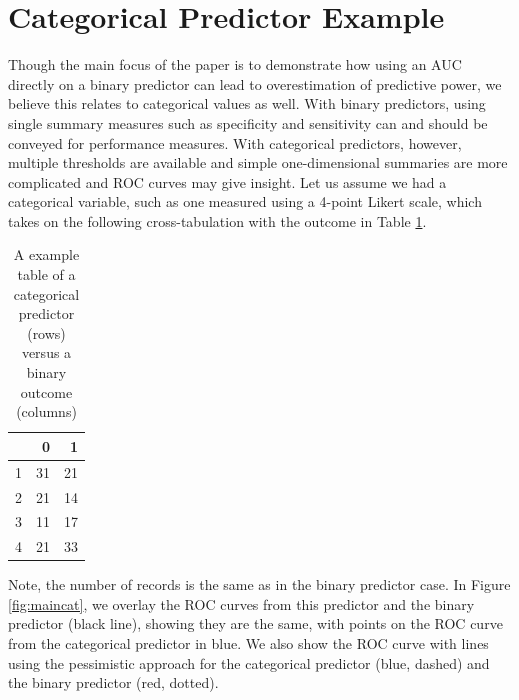 \documentclass[smallextended]{svjour3}       %
\begin{document}
\hypertarget{categorical-predictor-example}{%
\section{Categorical Predictor
Example}\label{categorical-predictor-example}}

Though the main focus of the paper is to demonstrate how using an AUC
directly on a binary predictor can lead to overestimation of predictive
power, we believe this relates to categorical values as well. With
binary predictors, using single summary measures such as specificity and
sensitivity can and should be conveyed for performance measures. With
categorical predictors, however, multiple thresholds are available and
simple one-dimensional summaries are more complicated and ROC curves may
give insight. Let us assume we had a categorical variable, such as one
measured using a 4-point Likert scale, which takes on the following
cross-tabulation with the outcome in Table
\ref{tab:create_cat_tab_output}.

\begin{table}[ht]

\caption{\label{tab:create_cat_tab_output}A example table of a categorical predictor (rows) versus a binary outcome (columns)}
\centering
\begin{tabular}{l|r|r}
\hline
  & 0 & 1\\
\hline
1 & 31 & 21\\
\hline
2 & 21 & 14\\
\hline
3 & 11 & 17\\
\hline
4 & 21 & 33\\
\hline
\end{tabular}
\end{table}

Note, the number of records is the same as in the binary predictor case.
In Figure \ref{fig:maincat}, we overlay the ROC curves from this
predictor and the binary predictor (black line), showing they are the
same, with points on the ROC curve from the categorical predictor in
blue. We also show the ROC curve with lines using the pessimistic
approach for the categorical predictor (blue, dashed) and the binary
predictor (red, dotted).
\end{document}
